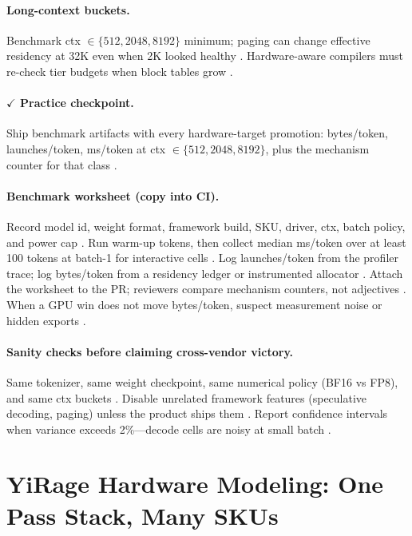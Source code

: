\paragraph{Long-context buckets.}
Benchmark ctx $\in\{512,2048,8192\}$ minimum; paging can change effective residency at 32K even when 2K looked healthy \citep{kwon2023vllm,dao2022flashattention}.
Hardware-aware compilers must re-check tier budgets when block tables grow \citep{yirage2026,memoryfloor2026}.

\paragraph{$\checkmark$ Practice checkpoint.}
Ship benchmark artifacts with every hardware-target promotion: bytes/token, launches/token, ms/token at ctx $\in\{512,2048,8192\}$, plus the mechanism counter for that class \citep{taxbreak2026,memoryfloor2026}.

\paragraph{Benchmark worksheet (copy into CI).}
Record model id, weight format, framework build, SKU, driver, ctx, batch policy, and power cap \citep{memoryfloor2026,yirage2026}.
Run warm-up tokens, then collect median ms/token over at least 100 tokens at batch-1 for interactive cells \citep{taxbreak2026}.
Log launches/token from the profiler trace; log bytes/token from a residency ledger or instrumented allocator \citep{kwon2023vllm,memoryfloor2026}.
Attach the worksheet to the PR; reviewers compare mechanism counters, not adjectives \citep{patel2025llminference}.
When a GPU win does not move bytes/token, suspect measurement noise or hidden exports \citep{chen2020compilerbasedhardw}.

\paragraph{Sanity checks before claiming cross-vendor victory.}
Same tokenizer, same weight checkpoint, same numerical policy (BF16 vs FP8), and same ctx buckets \citep{liu2024deepseekv3,memoryfloor2026}.
Disable unrelated framework features (speculative decoding, paging) unless the product ships them \citep{kwon2023vllm}.
Report confidence intervals when variance exceeds 2\%---decode cells are noisy at small batch \citep{patel2025llminference}.

\section{YiRage Hardware Modeling: One Pass Stack, Many SKUs}
\label{sec:yirage_modeling}

